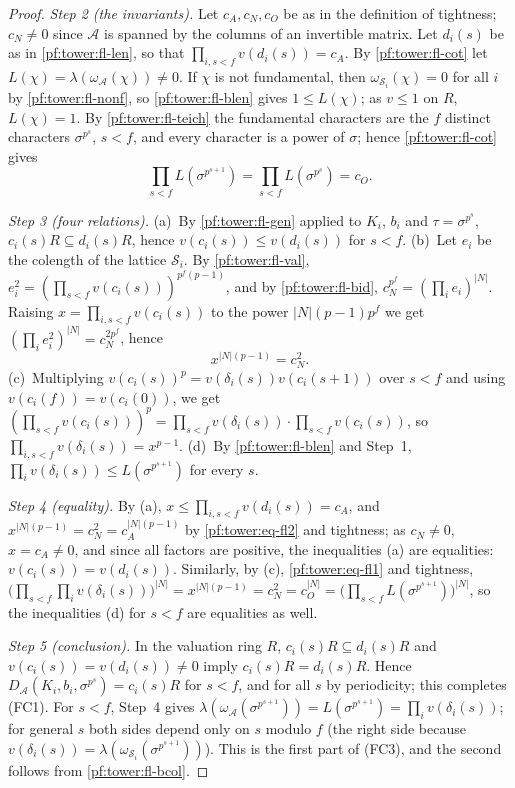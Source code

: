 \begin{proof}
\emph{Step 2 (the invariants).} Let $c_A,c_N,c_O$ be as in the definition of tightness; $c_N\ne0$ since $\mathcal A$ is
spanned by the columns of an invertible matrix. Let $d_i(s)$ be as in \ref{pf:tower:fl-len}, so that
$\prod_{i,s<f}v(d_i(s))=c_A$. By \ref{pf:tower:fl-cot} let $L(\chi)=\lambda(\omega_{\mathcal A}(\chi))\ne0$. If $\chi$ is not
fundamental, then $\omega_{\mathcal S_i}(\chi)=0$ for all $i$ by \ref{pf:tower:fl-nonf}, so \ref{pf:tower:fl-blen} gives
$1\le L(\chi)$; as $v\le1$ on $R$, $L(\chi)=1$. By \ref{pf:tower:fl-teich} the fundamental characters are the $f$ distinct
characters $\sigma^{p^s}$, $s<f$, and every character is a power of $\sigma$; hence \ref{pf:tower:fl-cot} gives
\begin{equation}\label{pf:tower:eq-fl1}
\textstyle\prod_{s<f}L(\sigma^{p^{s+1}})=\prod_{s<f}L(\sigma^{p^s})=c_O .
\end{equation}

\emph{Step 3 (four relations).} (a)~By \ref{pf:tower:fl-gen} applied to $K_i$, $b_i$ and $\tau=\sigma^{p^s}$,
$c_i(s)R\subseteq d_i(s)R$, hence $v(c_i(s))\le v(d_i(s))$ for $s<f$.
(b)~Let $e_i$ be the colength of the lattice $\mathcal S_i$. By \ref{pf:tower:fl-val},
$e_i^2=(\prod_{s<f}v(c_i(s)))^{p^f(p-1)}$, and by \ref{pf:tower:fl-bid}, $c_N^{p^f}=(\prod_ie_i)^{|N|}$. Raising
$x=\prod_{i,s<f}v(c_i(s))$ to the power $|N|(p-1)p^f$ we get $(\prod_ie_i^2)^{|N|}=c_N^{2p^f}$, hence
\begin{equation}\label{pf:tower:eq-fl2}
x^{|N|(p-1)}=c_N^2 .
\end{equation}
(c)~Multiplying $v(c_i(s))^p=v(\delta_i(s))v(c_i(s+1))$ over $s<f$ and using $v(c_i(f))=v(c_i(0))$, we get
$(\prod_{s<f}v(c_i(s)))^p=\prod_{s<f}v(\delta_i(s))\cdot\prod_{s<f}v(c_i(s))$, so
$\prod_{i,s<f}v(\delta_i(s))=x^{p-1}$.
(d)~By \ref{pf:tower:fl-blen} and Step~1, $\prod_iv(\delta_i(s))\le L(\sigma^{p^{s+1}})$ for every $s$.

\emph{Step 4 (equality).} By (a), $x\le\prod_{i,s<f}v(d_i(s))=c_A$, and $x^{|N|(p-1)}=c_N^2=c_A^{|N|(p-1)}$ by
\eqref{pf:tower:eq-fl2} and tightness; as $c_N\ne0$, $x=c_A\ne0$, and since all factors are positive, the inequalities (a) are
equalities: $v(c_i(s))=v(d_i(s))$. Similarly, by (c), \eqref{pf:tower:eq-fl1} and tightness,
$\bigl(\prod_{s<f}\prod_iv(\delta_i(s))\bigr)^{|N|}=x^{|N|(p-1)}=c_N^2=c_O^{|N|}=\bigl(\prod_{s<f}L(\sigma^{p^{s+1}})\bigr)^{|N|}$,
so the inequalities (d) for $s<f$ are equalities as well.

\emph{Step 5 (conclusion).} In the valuation ring $R$, $c_i(s)R\subseteq d_i(s)R$ and $v(c_i(s))=v(d_i(s))\ne0$ imply
$c_i(s)R=d_i(s)R$. Hence $D_{\mathcal A}(K_i,b_i,\sigma^{p^s})=c_i(s)R$ for $s<f$, and for all $s$ by periodicity; this
completes (FC1). For $s<f$, Step~4 gives $\lambda(\omega_{\mathcal A}(\sigma^{p^{s+1}}))=L(\sigma^{p^{s+1}})=\prod_iv(\delta_i(s))$;
for general $s$ both sides depend only on $s$ modulo $f$ (the right side because $v(\delta_i(s))=\lambda(\omega_{\mathcal S_i}(\sigma^{p^{s+1}}))$).
This is the first part of (FC3), and the second follows from \ref{pf:tower:fl-bcol}.
\end{proof}

